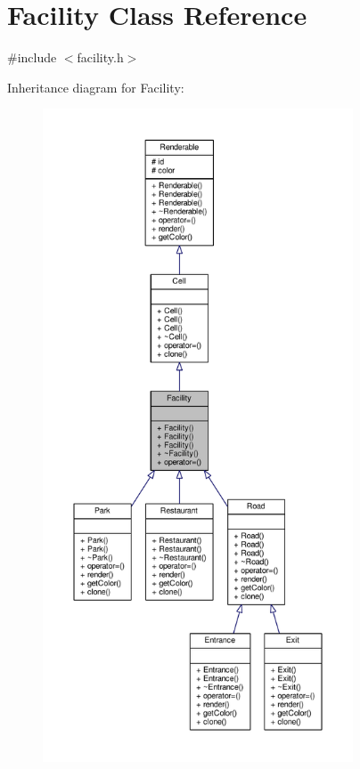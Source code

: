 \hypertarget{classFacility}{}\section{Facility Class Reference}
\label{classFacility}


{\ttfamily \#include $<$facility.\+h$>$}



Inheritance diagram for Facility\+:
\nopagebreak
\begin{figure}[H]
\begin{center}
\leavevmode
\includegraphics[height=550pt]{classFacility__inherit__graph}
\end{center}
\end{figure}


